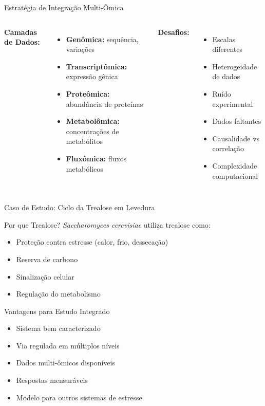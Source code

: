 \begin{frame}{Estratégia de Integração Multi-Ômica}
\begin{columns}
\textbf{Camadas de Dados:}
\begin{itemize}
    \item \textbf{Genômica:} sequência, variações
    \item \textbf{Transcriptômica:} expressão gênica
    \item \textbf{Proteômica:} abundância de proteínas
    \item \textbf{Metabolômica:} concentrações de metabólitos
    \item \textbf{Fluxômica:} fluxos metabólicos
\end{itemize}

\textbf{Desafios:}
\begin{itemize}
    \item Escalas diferentes
    \item Heterogeidade de dados
    \item Ruído experimental
    \item Dados faltantes
    \item Causalidade vs correlação
    \item Complexidade computacional
\end{itemize}
\end{columns}

\vspace{0.3cm}

\end{frame}

\begin{frame}{Caso de Estudo: Ciclo da Trealose em Levedura}
\begin{block}{Por que Trealose?}
\textit{Saccharomyces cerevisiae} utiliza trealose como:
\begin{itemize}
    \item Proteção contra estresse (calor, frio, dessecação)
    \item Reserva de carbono
    \item Sinalização celular
    \item Regulação do metabolismo
\end{itemize}
\end{block}

\vspace{0.3cm}

\begin{exampleblock}{Vantagens para Estudo Integrado}
\begin{itemize}
    \item Sistema bem caracterizado
    \item Via regulada em múltiplos níveis
    \item Dados multi-ômicos disponíveis
    \item Respostas mensuráveis
    \item Modelo para outros sistemas de estresse
\end{itemize}
\end{exampleblock}
\end{frame}

